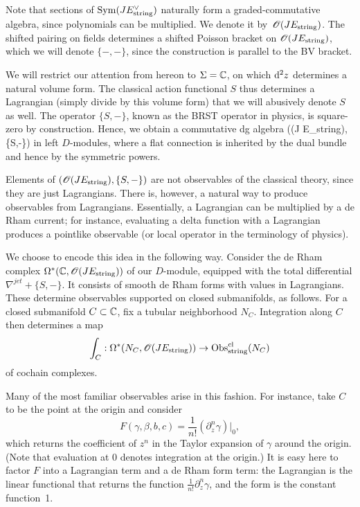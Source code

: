 Note that sections of ${\rm Sym}(J E_{\rm string}^\vee)$ naturally form a graded-commutative algebra, 
since polynomials can be multiplied.
We denote it by~$\mathscr O(J E_{\rm string})$.
The shifted pairing on fields determines a shifted Poisson bracket on $\mathscr O(J E_{\rm string})$,
which we will denote $\{-,-\}$,
since the construction is parallel to the BV bracket.

We will restrict our attention from hereon to $\Sigma = \mathbb C$,
on which ${\rm d}^2 z$ determines a natural volume form.
The classical action functional $S$ thus determines a Lagrangian (simply divide by this volume form) that we will abusively denote $S$ as well.
The operator $\{S,-\}$, known as the BRST operator in physics, is square-zero by construction.
Hence, we obtain a commutative dg algebra 
\ben
\left(\sO(J E_{\rm string}), \{S,-\}\right)
\een
in left $D$-modules,
where a flat connection is inherited by the dual bundle and hence by the symmetric powers.

Elements of $\left(\mathscr O(J E_{\rm string}), \{S,-\}\right)$ are not observables of the classical theory,
since they are just Lagrangians.
There is, however, a natural way to produce observables from Lagrangians.
Essentially, a Lagrangian can be multiplied by a de Rham current;
for instance, evaluating a delta function with a Lagrangian produces a pointlike observable
(or local operator in the terminology of physics).

We choose to encode this idea in the following way.
Consider the de Rham complex $\Omega^*(\mathbb C , \mathscr O(J E_{\rm string}))$ of our $D$-module,
equipped with the total differential $\nabla^{jet} + \{S, -\}$. 
It consists of smooth de Rham forms with values in Lagrangians.
These determine observables supported on closed submanifolds, as follows.
For a closed submanifold $C \subset \mathbb C$, 
fix a tubular neighborhood $N_C$.
Integration along $C$ then determines a map 
\begin{equation}
\label{eqn: int over C}
\int_C : \Omega^*(N_C , \mathscr O(J E_{\rm string})) \to {\rm Obs}^{{\rm cl}}_{\rm string}(N_C) 
\end{equation}
of cochain complexes.

Many of the most familiar observables arise in this fashion.
For instance, take $C$ to be the point at the origin and consider
\[
F(\gamma,\beta,b,c) = \frac{1}{n!}(\partial_z^n \gamma)\big|_{0},
\]
which returns the coefficient of $z^n$ in the Taylor expansion of $\gamma$ around the origin.
(Note that evaluation at $0$ denotes integration at the origin.)
It is easy here to factor $F$ into a Lagrangian term and a de Rham form term: 
the Lagrangian is the linear functional that returns the function $\frac{1}{n!}\partial_z^n \gamma$, 
and the form is the constant function~1.

